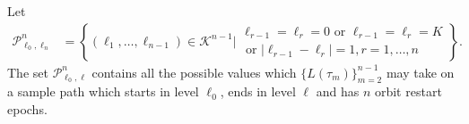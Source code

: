 Let 
\begin{align}\label{eqn: paths set1}
	\mathcal P^n_{\ell_0,\ell_n}&=\left\{(\ell_1,\dots,\ell_{n-1}) \in \mathcal K^{n-1}\Bigg| \begin{array}{c}  \ell_{r-1}=\ell_r=0 \mbox{ or } \ell_{r-1}=\ell_r=K
		\\ \mbox{ or }|\ell_{r-1}-\ell_r|=1,r = 1,\dots,n\end{array}\right\}.
\end{align}
The set \(\mathcal P^n_{\ell_0,\ell}\) contains all the possible values which \(\{L(\tau_m)\}_{m=2}^{n-1}\) may take on a sample path which starts in level \(\ell_0\), ends in level \(\ell\) and has \(n\) orbit restart epochs. %

